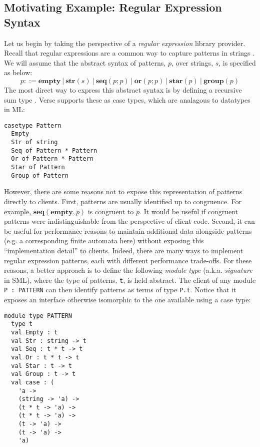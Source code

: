 \subsection{Motivating Example: Regular Expression Syntax}\label{sec:examples}
Let us begin by taking the perspective of a \emph{regular expression} library provider. Recall that regular expressions are a common way to capture patterns in strings \cite{Thompson:1968:PTR:363347.363387}. We will assume that the abstract syntax of {patterns}, $p$, over strings, $s$, is specified as below:\[p ::= \textbf{empty} ~|~ \textbf{str}(s) ~|~ \textbf{seq}(p; p) ~|~ \textbf{or}(p; p) ~|~ \textbf{star}(p) ~|~ \textbf{group}(p)\]
The most direct way to express this abstract syntax is by defining a recursive sum type \cite{pfpl}. Verse supports these as case types, which are analagous to datatypes in ML:

\begin{lstlisting}[numbers=none]
casetype Pattern
  Empty
  Str of string
  Seq of Pattern * Pattern
  Or of Pattern * Pattern
  Star of Pattern
  Group of Pattern
\end{lstlisting}

However, there are some reasons not to expose this representation of patterns directly to clients. First, patterns are usually identified up to congruence. For example, $\textbf{seq}(\textbf{empty}, p)$ is congruent to $p$. It would be useful if congruent patterns were indistinguishable from the perspective of client code. Second, it can be useful for performance reasons to maintain additional data alongside patterns (e.g. a corresponding finite automata here) without exposing this ``implementation detail'' to clients. Indeed, there are many ways to implement regular expression patterns, each with different performance trade-offs. For these reasons, a better approach is to define the following \emph{module type} (a.k.a. \emph{signature} in SML), where the type of patterns, \lstinline{t}, is held abstract. The client of any module \lstinline{P : PATTERN} can then identify patterns as terms of type \verb|P.t|. 
Notice that it exposes an interface otherwise isomorphic to the one available using a case type:

\begin{lstlisting}[deletekeywords={case},numbers=none]
module type PATTERN
  type t
  val Empty : t
  val Str : string -> t
  val Seq : t * t -> t
  val Or : t * t -> t
  val Star : t -> t
  val Group : t -> t
  val case : (
    'a -> 
    (string -> 'a) ->
    (t * t -> 'a) ->
    (t * t -> 'a) ->
    (t -> 'a) ->
    (t -> 'a) -> 
    'a)
\end{lstlisting}

